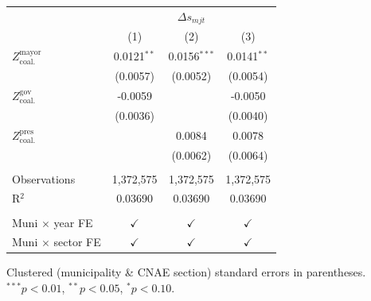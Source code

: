\begingroup
\centering
\begin{tabular}{lccc}
   \toprule
    & \multicolumn{3}{c}{$\Delta s_{mjt}$}\\
                                       & (1)           & (2)            & (3)\\  
   \midrule 
   $Z^{\text{mayor}}_{\text{coal.}}$   & 0.0121$^{**}$ & 0.0156$^{***}$ & 0.0141$^{**}$\\   
                                       & (0.0057)      & (0.0052)       & (0.0054)\\   
   $Z^{\text{gov}}_{\text{coal.}}$     & -0.0059       &                & -0.0050\\   
                                       & (0.0036)      &                & (0.0040)\\   
   $Z^{\text{pres}}_{\text{coal.}}$    &               & 0.0084         & 0.0078\\   
                                       &               & (0.0062)       & (0.0064)\\   
    \\
   Observations                        & 1,372,575     & 1,372,575      & 1,372,575\\  
   R$^2$                               & 0.03690       & 0.03690        & 0.03690\\  
    \\
   Muni $\times$ year FE               & $\checkmark$  & $\checkmark$   & $\checkmark$\\   
   Muni $\times$ sector FE             & $\checkmark$  & $\checkmark$   & $\checkmark$\\   
   \bottomrule
\end{tabular}
 
\par \raggedright 
Clustered (municipality \& CNAE section) standard errors in parentheses. $^{***}p<0.01$, $^{**}p<0.05$, $^{*}p<0.10$.
\par\endgroup
